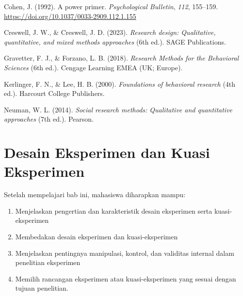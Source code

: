 \documentclass[
  indonesian,
  letterpaper,
  DIV=11,
  numbers=noendperiod]{scrreprt}
\newlength{\cslhangindent}
\newenvironment{CSLReferences}[2] %
 {\begin{list}{}{%
  \setlength{\itemindent}{0pt}
  \setlength{\leftmargin}{0pt}
  \setlength{\parsep}{0pt}
  \ifodd #1
   \setlength{\leftmargin}{\cslhangindent}
   \setlength{\itemindent}{-1\cslhangindent}
  \fi
  \setlength{\itemsep}{#2\baselineskip}}}
 {\end{list}}
\providecommand{\tightlist}{%
  \setlength{\itemsep}{0pt}\setlength{\parskip}{0pt}}
\begin{document}
\label{refs--11}
\begin{CSLReferences}{1}{0}
Cohen, J. (1992). A power primer. \emph{Psychological Bulletin},
\emph{112}, 155--159. \url{https://doi.org/10.1037/0033-2909.112.1.155}

Creswell, J. W., \& Creswell, J. D. (2023). \emph{Research design:
Qualitative, quantitative, and mixed methods approaches} (6th ed.). SAGE
Publications.

Gravetter, F. J., \& Forzano, L. B. (2018). \emph{Research Methods for
the Behavioral Sciences} (6th ed.). Cengage Learning EMEA (UK; Europe).

Kerlinger, F. N., \& Lee, H. B. (2000). \emph{Foundations of behavioral
research} (4th ed.). Harcourt College Publishers.

Neuman, W. L. (2014). \emph{Social research methods: Qualitative and
quantitative approaches} (7th ed.). Pearson.

\end{CSLReferences}

\chapter{Desain Eksperimen dan Kuasi
Eksperimen}\label{desain-eksperimen-dan-kuasi-eksperimen}

\begin{tcolorbox}[enhanced jigsaw, colframe=quarto-callout-note-color-frame, toptitle=1mm, breakable, leftrule=.75mm, arc=.35mm, toprule=.15mm, colback=white, colbacktitle=quarto-callout-note-color!10!white, bottomtitle=1mm, bottomrule=.15mm, titlerule=0mm, title=\textcolor{quarto-callout-note-color}{\faInfo}\hspace{0.5em}{Capaian Pembelajaran}, coltitle=black, left=2mm, opacitybacktitle=0.6, opacityback=0, rightrule=.15mm]

Setelah mempelajari bab ini, mahasiswa diharapkan mampu:

\begin{enumerate}
\def\labelenumi{\arabic{enumi}.}
\tightlist
\item
  Menjelaskan pengertian dan karakteristik desain eksperimen serta
  kuasi-eksperimen
\item
  Membedakan desain eksperimen dan kuasi-eksperimen
\item
  Menjelaskan pentingnya manipulasi, kontrol, dan validitas internal
  dalam penelitian eksperimen
\item
  Memilih rancangan eksperimen atau kuasi-eksperimen yang sesuai dengan
  tujuan penelitian.
\end{enumerate}

\end{tcolorbox}
\end{document}
